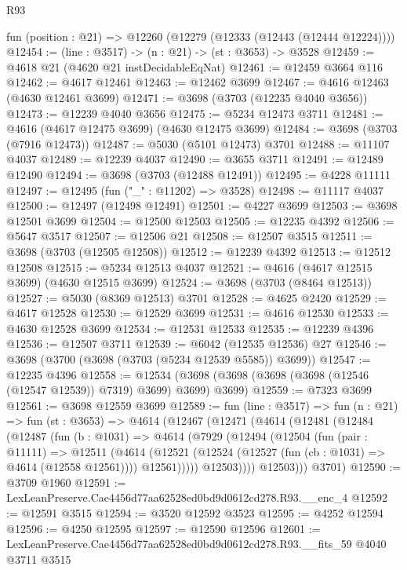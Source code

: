 \begin{lexlean}{R93}
\begin{coremodule}
  fun (position : @21) => @12260 (@12279 (@12333 (@12443 (@12444 @12224))))
@12454 := (line : @3517) -> (n : @21) -> (st : @3653) -> @3528
@12459 := @4618 @21 (@4620 @21 instDecidableEqNat)
@12461 := @12459 @3664 @116
@12462 := @4617 @12461
@12463 := @12462 @3699
@12467 := @4616 @12463 (@4630 @12461 @3699)
@12471 := @3698 (@3703 (@12235 @4040 @3656))
@12473 := @12239 @4040 @3656
@12475 := @5234 @12473 @3711
@12481 := @4616 (@4617 @12475 @3699) (@4630 @12475 @3699)
@12484 := @3698 (@3703 (@7916 @12473))
@12487 := @5030 (@5101 @12473) @3701
@12488 := @11107 @4037
@12489 := @12239 @4037
@12490 := @3655 @3711
@12491 := @12489 @12490
@12494 := @3698 (@3703 (@12488 @12491))
@12495 := @4228 @11111
@12497 := @12495 (fun ("_" : @11202) => @3528)
@12498 := @11117 @4037
@12500 := @12497 (@12498 @12491)
@12501 := @4227 @3699
@12503 := @3698 @12501 @3699
@12504 := @12500 @12503
@12505 := @12235 @4392
@12506 := @5647 @3517
@12507 := @12506 @21
@12508 := @12507 @3515
@12511 := @3698 (@3703 (@12505 @12508))
@12512 := @12239 @4392
@12513 := @12512 @12508
@12515 := @5234 @12513 @4037
@12521 := @4616 (@4617 @12515 @3699) (@4630 @12515 @3699)
@12524 := @3698 (@3703 (@8464 @12513))
@12527 := @5030 (@8369 @12513) @3701
@12528 := @4625 @2420
@12529 := @4617 @12528
@12530 := @12529 @3699
@12531 := @4616 @12530
@12533 := @4630 @12528 @3699
@12534 := @12531 @12533
@12535 := @12239 @4396
@12536 := @12507 @3711
@12539 := @6042 (@12535 @12536) @27
@12546 := @3698 (@3700 (@3698 (@3703 (@5234 @12539 @5585)) @3699))
@12547 := @12235 @4396
@12558 := @12534 (@3698 (@3698 (@3698 (@3698 (@12546 (@12547 @12539)) @7319) @3699) @3699) @3699)
@12559 := @7323 @3699
@12561 := @3698 @12559 @3699
@12589 := fun (line : @3517) =>
  fun (n : @21) =>
  fun (st : @3653) =>
  @4614
    (@12467
      (@12471
        (@4614
          (@12481
            (@12484
              (@12487
                (fun (b : @1031) =>
                @4614
                  (@7929
                    (@12494
                      (@12504
                        (fun (pair : @11111) =>
                        @12511
                          (@4614
                            (@12521
                              (@12524 (@12527 (fun (cb : @1031) => @4614 (@12558 @12561))))
                              @12561)))))
                    @12503))))
            @12503)))
      @3701)
@12590 := @3709 @1960
@12591 := LexLeanPreserve.Cae4456d77aa62528ed0bd9d0612cd278.R93.__enc_4
@12592 := @12591 @3515
@12594 := @3520 @12592 @3523
@12595 := @4252 @12594
@12596 := @4250 @12595
@12597 := @12590 @12596
@12601 := LexLeanPreserve.Cae4456d77aa62528ed0bd9d0612cd278.R93.__fits_59 @4040 @3711 @3515

\end{coremodule}
\end{lexlean}
